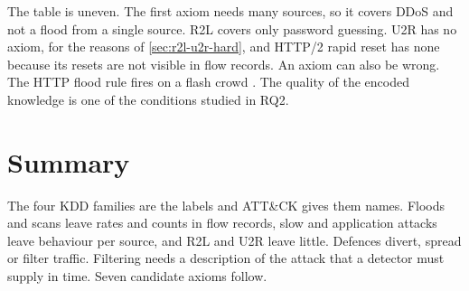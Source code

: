 The table is uneven. The first axiom needs many sources, so it covers DDoS
and not a flood from a single source. R2L covers only password guessing. U2R
has no axiom, for the reasons of \cref{sec:r2l-u2r-hard}, and HTTP/2 rapid
reset has none because its resets are not visible in flow records. An axiom
can also be wrong. The HTTP flood rule fires on a flash crowd
\citep{handley2006rfc4732}. The quality of the encoded knowledge is one of the
conditions studied in RQ2.

\section{Summary}
\label{sec:ch3-summary}

The four KDD families are the labels and ATT\&CK gives them names. Floods
and scans leave rates and counts in flow records, slow and application
attacks leave behaviour per source, and R2L and U2R leave little. Defences
divert, spread or filter traffic. Filtering needs a description of the attack
that a detector must supply in time. Seven candidate axioms follow.